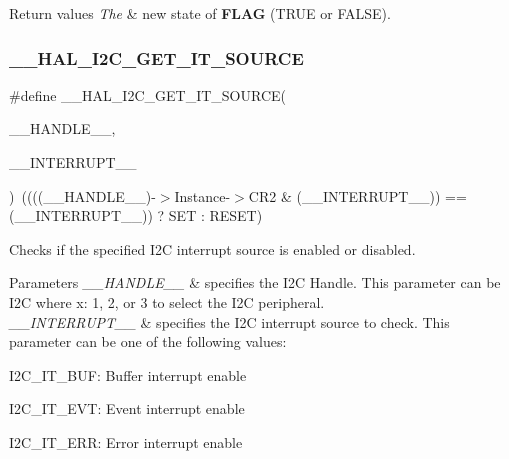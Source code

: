 \begin{DoxyRetVals}{Return values}
{\em The} & new state of {\bfseries F\+L\+AG} (T\+R\+UE or F\+A\+L\+SE). \\
\hline
\end{DoxyRetVals}
\mbox{\label{group___i2_c___exported___macros_ga932024bf4a259e0cdaf9e50b38e3d41a}} 
\subsubsection{\texorpdfstring{\+\_\+\+\_\+\+H\+A\+L\+\_\+\+I2\+C\+\_\+\+G\+E\+T\+\_\+\+I\+T\+\_\+\+S\+O\+U\+R\+CE}{\_\_HAL\_I2C\_GET\_IT\_SOURCE}}
{\footnotesize\ttfamily \#define \+\_\+\+\_\+\+H\+A\+L\+\_\+\+I2\+C\+\_\+\+G\+E\+T\+\_\+\+I\+T\+\_\+\+S\+O\+U\+R\+CE(\begin{DoxyParamCaption}\item[{}]{\+\_\+\+\_\+\+H\+A\+N\+D\+L\+E\+\_\+\+\_\+,  }\item[{}]{\+\_\+\+\_\+\+I\+N\+T\+E\+R\+R\+U\+P\+T\+\_\+\+\_\+ }\end{DoxyParamCaption})~((((\+\_\+\+\_\+\+H\+A\+N\+D\+L\+E\+\_\+\+\_\+)-\/$>$Instance-\/$>$C\+R2 \& (\+\_\+\+\_\+\+I\+N\+T\+E\+R\+R\+U\+P\+T\+\_\+\+\_\+)) == (\+\_\+\+\_\+\+I\+N\+T\+E\+R\+R\+U\+P\+T\+\_\+\+\_\+)) ? S\+ET \+: R\+E\+S\+ET)}



Checks if the specified I2C interrupt source is enabled or disabled. 


\begin{DoxyParams}{Parameters}
{\em \+\_\+\+\_\+\+H\+A\+N\+D\+L\+E\+\_\+\+\_\+} & specifies the I2C Handle. This parameter can be I2C where x\+: 1, 2, or 3 to select the I2C peripheral. \\
\hline
{\em \+\_\+\+\_\+\+I\+N\+T\+E\+R\+R\+U\+P\+T\+\_\+\+\_\+} & specifies the I2C interrupt source to check. This parameter can be one of the following values\+: \begin{DoxyItemize}
\item I2\+C\+\_\+\+I\+T\+\_\+\+B\+UF\+: Buffer interrupt enable \item I2\+C\+\_\+\+I\+T\+\_\+\+E\+VT\+: Event interrupt enable \item I2\+C\+\_\+\+I\+T\+\_\+\+E\+RR\+: Error interrupt enable \end{DoxyItemize}
\\
\hline
\end{DoxyParams}

